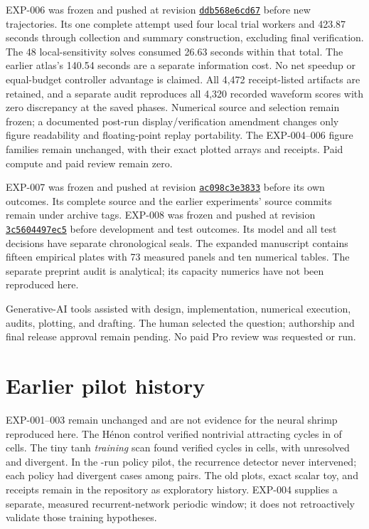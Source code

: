 \documentclass[11pt,letterpaper]{article}
\begin{document}
EXP-006 was frozen and pushed at revision \href{https://github.com/tdj28/neural-shrimp/commit/ddb568e6cd67ef2cfbdb45e05710cd86025ef548}{\texttt{ddb568e6cd67}} before new trajectories. Its one complete attempt used four local trial workers and 423.87 seconds through collection and summary construction, excluding final verification. The 48 local-sensitivity solves consumed 26.63 seconds within that total. The earlier atlas's 140.54 seconds are a separate information cost. No net speedup or equal-budget controller advantage is claimed. All 4,472 receipt-listed artifacts are retained, and a separate audit reproduces all 4,320 recorded waveform scores with zero discrepancy at the saved phases. Numerical source and selection remain frozen; a documented post-run display/verification amendment changes only figure readability and floating-point replay portability. The EXP-004--006 figure families remain unchanged, with their exact plotted arrays and receipts. Paid compute and paid review remain zero.

EXP-007 was frozen and pushed at revision \href{https://github.com/tdj28/neural-shrimp/commit/ac098c3e3833daaf27c7dc2869d45e8b7085f948}{\texttt{ac098c3e3833}} before its own outcomes. Its complete source and the earlier experiments' source commits remain under archive tags. EXP-008 was frozen and pushed at revision \href{https://github.com/tdj28/neural-shrimp/commit/3c5604497ec57b19d62fbb595da7b190102f4b33}{\texttt{3c5604497ec5}} before development and test outcomes. Its model and all test decisions have separate chronological seals. The expanded manuscript contains fifteen empirical plates with 73 measured panels and ten numerical tables. The separate preprint audit is analytical; its capacity numerics have not been reproduced here.

Generative-AI tools assisted with design, implementation, numerical execution, audits, plotting, and drafting. The human selected the question; authorship and final release approval remain pending. No paid Pro review was requested or run.

\appendix
\section{Earlier pilot history}
EXP-001--003 remain unchanged and are not evidence for the neural shrimp reproduced here. The H\'enon control verified nontrivial attracting cycles in \HenonCycles{} of \HenonTrials{} cells. The tiny tanh \emph{training} scan found \TrainingCycles{} verified cycles in \TrainingTrials{} cells, with \TrainingUnresolved{} unresolved and \TrainingDivergent{} divergent. In the \UtilityTrials{}-run policy pilot, the recurrence detector never intervened; each policy had \PolicyDivergent{} divergent cases among \PolicyTrials{} pairs. The old plots, exact scalar toy, and receipts remain in the repository as exploratory history. EXP-004 supplies a separate, measured recurrent-network periodic window; it does not retroactively validate those training hypotheses.

{\small\setlength{\bibsep}{3pt}


}
\end{document}
